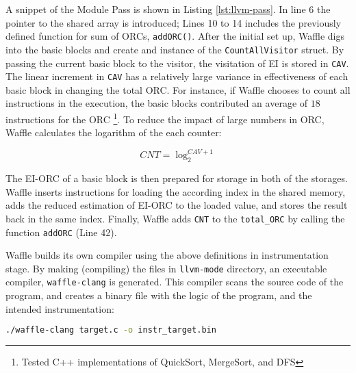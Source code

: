 


A snippet of the Module Pass is shown in Listing \ref{lst:llvm-pass}. In line 6 the pointer to the shared array is introduced; Lines 10 to 14 includes the previously defined function for sum of ORCs, \texttt{addORC()}. After the initial set up, Waffle digs into the basic blocks and create and instance of the \texttt{CountAllVisitor} struct. By passing the current basic block to the visitor, the visitation of EI is stored in \texttt{CAV}. The linear increment in \texttt{CAV} has a relatively large variance in effectiveness of each basic block in changing the total ORC. For instance, if Waffle chooses to count all instructions in the execution, the basic blocks contributed an average of $18$ instructions for the ORC \footnote{Tested C++ implementations of QuickSort, MergeSort, and DFS}. To reduce the impact of large numbers in ORC, Waffle calculates the logarithm of the each counter: 

\begin{equation}
  \label{eq:log}
  CNT = \log_{2}^{CAV+1} 
\end{equation}

The EI-ORC of a basic block is then prepared for storage in both of the storages. Waffle inserts instructions for loading the according index in the shared memory, adds the reduced estimation of EI-ORC to the loaded value, and stores the result back in the same index. Finally, Waffle adds \texttt{CNT} to the \texttt{total\_ORC} by calling the function \texttt{addORC} (Line 42).



Waffle builds its own compiler using the above definitions in instrumentation stage. By making (compiling) the files in \texttt{llvm-mode} directory, an executable compiler, \texttt{waffle-clang} is generated. This compiler scans the source code of the program, and creates a binary file with the logic of the program, and the intended instrumentation:

\begin{lstlisting}[language=bash,style=CommandStyle,label={lst:wafl-clang}]
  ./waffle-clang target.c -o instr_target.bin
\end{lstlisting}